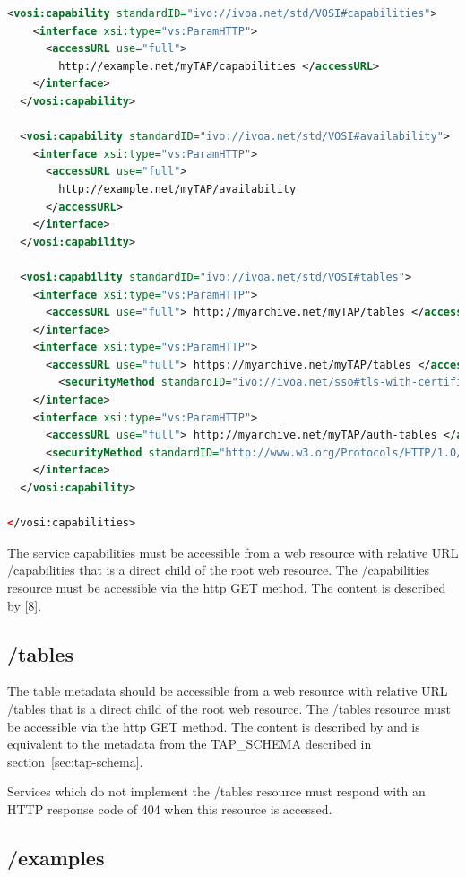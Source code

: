 \documentclass[11pt,letter]{ivoa}
\begin{document}
\begin{lstlisting}[language=XML]
  <vosi:capability standardID="ivo://ivoa.net/std/VOSI#capabilities">
    <interface xsi:type="vs:ParamHTTP">
      <accessURL use="full">
        http://example.net/myTAP/capabilities </accessURL>
    </interface>
  </vosi:capability>

  <vosi:capability standardID="ivo://ivoa.net/std/VOSI#availability">
    <interface xsi:type="vs:ParamHTTP">
      <accessURL use="full">
        http://example.net/myTAP/availability
      </accessURL>
    </interface>
  </vosi:capability>

  <vosi:capability standardID="ivo://ivoa.net/std/VOSI#tables">
    <interface xsi:type="vs:ParamHTTP">
      <accessURL use="full"> http://myarchive.net/myTAP/tables </accessURL>
    </interface>
    <interface xsi:type="vs:ParamHTTP">
      <accessURL use="full"> https://myarchive.net/myTAP/tables </accessURL>
        <securityMethod standardID="ivo://ivoa.net/sso#tls-with-certificate" />
    </interface>
    <interface xsi:type="vs:ParamHTTP">
      <accessURL use="full"> http://myarchive.net/myTAP/auth-tables </accessURL>
      <securityMethod standardID="http://www.w3.org/Protocols/HTTP/1.0/spec.html#BasicAA" />
    </interface>
  </vosi:capability>

</vosi:capabilities>
\end{lstlisting}

The service capabilities must be accessible from a web resource with relative 
URL /capabilities that is a direct child of the root web resource. The 
/capabilities resource must be accessible via the http GET method. The content 
is described by [8].

\subsection{/tables}
\label{sec:vosi-tables}

The table metadata should be accessible from a web resource with relative URL 
/tables that is a direct child of the root web resource. The /tables resource 
must be accessible via the http GET method. The content is described by 
\citep{std:VODS11} and is equivalent to the metadata from the 
TAP\_SCHEMA described in section~\ref{sec:tap-schema}.

Services which do not implement the /tables resource must respond with an HTTP 
response code of 404 when this resource is accessed.

\subsection{/examples}
\label{sec:dali-examples}
\end{document}
